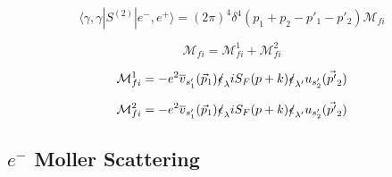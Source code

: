 \documentclass[a4]{article}
\begin{document}
        \begin{framed}

            \begin{equation}
                \langle \gamma, \gamma | S^{(2)} | e^{-}, e^{+} \rangle = (2 \pi)^{4} \delta^{4} (p_1 + p_2 - p'_1 - p'_2) \mathcal{M}_{fi}
            \end{equation}

            \begin{equation}
                \mathcal{M}_{fi} = \mathcal{M}_{fi}^{1} + \mathcal{M}_{fi}^{2}
            \end{equation}

            \begin{equation}
                \mathcal{M}_{fi}^{1} = -e^{2} \overline{v}_{s'_1} (\vec{p}_1) \slashed{\epsilon}_{\lambda} i S_{F} (p + k) \slashed{\epsilon}_{\lambda'} u_{s'_2} (\vec{p'}_2)
            \end{equation}

            \begin{equation}
                \mathcal{M}_{fi}^{2} = -e^{2} \overline{v}_{s'_1} (\vec{p}_1) \slashed{\epsilon}_{\lambda} i S_{F} (p + k) \slashed{\epsilon}_{\lambda'} u_{s'_2} (\vec{p'}_2)
            \end{equation}

        \end{framed}

        \subsection{$e^{-}$ Moller Scattering}
\end{document}
